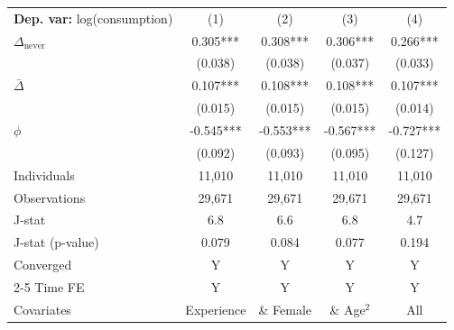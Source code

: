 \begin{tabular}{l cccc} \toprule  \textbf{Dep. var:}  log(consumption) 
                    &\multicolumn{1}{c}{(1)}   &\multicolumn{1}{c}{(2)}   &\multicolumn{1}{c}{(3)}   &\multicolumn{1}{c}{(4)}   \\

\addlinespace
$\Delta_{\text{never}}$&       0.305***&       0.308***&       0.306***&       0.266***\\
                    &     (0.038)   &     (0.038)   &     (0.037)   &     (0.033)   \\

\addlinespace
$\bar{\Delta}$      &       0.107***&       0.108***&       0.108***&       0.107***\\
                    &     (0.015)   &     (0.015)   &     (0.015)   &     (0.014)   \\

\addlinespace
$\phi$              &      -0.545***&      -0.553***&      -0.567***&      -0.727***\\
                    &     (0.092)   &     (0.093)   &     (0.095)   &     (0.127)   \\
\addlinespace
Individuals         &      11,010   &      11,010   &      11,010   &      11,010   \\
Observations        &      29,671   &      29,671   &      29,671   &      29,671   \\
J-stat              &         6.8   &         6.6   &         6.8   &         4.7   \\
J-stat (p-value)    &       0.079   &       0.084   &       0.077   &       0.194   \\
Converged           &           Y   &           Y   &           Y   &           Y   \\
\cmidrule{2-5} Time FE & Y & Y & Y & Y \\ Covariates & Experience & \& Female & \& Age$^2$ & All \\ \bottomrule \end{tabular}
